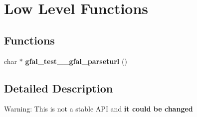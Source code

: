 \section{Low Level Functions}
\label{group__lowlevel__group}
\subsection*{Functions}
\begin{CompactItemize}
\item 
char $\ast$ \textbf{gfal\_\-test\_\-\_\-gfal\_\-parseturl} ()\label{group__lowlevel__group_g9282bb70dffe20af2db91d05418ac9c5}

\end{CompactItemize}


\subsection{Detailed Description}
\begin{Desc}
\item[Warning:]This is not a stable API and {\bf  it could be changed } \end{Desc}
